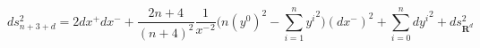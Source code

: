 \begin{equation}
\label{nonwinding}
ds^2_{n+3+d}=2dx^+dx^-+\frac{2n+4}{(n+4)^2}\frac{1}{{x^-}^2}\big(n(y^0)^2-\sum_{i=1}^{n}{y^i}^2\big)(dx^-)^2+\sum_{i=0}^{n}{dy^i}^2+ds^2_{\mathbf{R}^d}
\end{equation}

